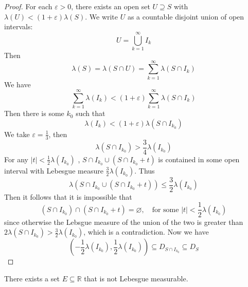 \documentclass[../main.tex]{subfiles}
\begin{document}
\begin{proof}
    For each \(   \varepsilon > 0  \), there exists an open set \(  U\supseteq S  \) with \(   \lambda \left( U \right)< \left( 1+  \varepsilon  \right) \lambda \left( S \right)     \). We write \(  U  \) as a countable disjoint union of open intervals: \[
    U = \bigcup _{k = 1}^{\infty}I_{k}
    \]Then \[
     \lambda \left( S \right)=  \lambda \left( S\cap U \right)= \sum _{k = 1}^{\infty} \lambda \left( S\cap I_{k} \right)   
    \] We have \[
    \sum _{k = 1}^{\infty} \lambda \left( I_{k} \right) < \left( 1+  \varepsilon  \right) \sum _{k= 1}^{\infty} \lambda \left( S\cap I_{k} \right)   
    \] Then there is some \(   k_0 \) such that \[
     \lambda \left( I_{k} \right)< \left( 1+  \varepsilon  \right) \lambda \left( S\cap I_{k_0} \right)   
    \]     We take \(   \varepsilon = \frac{1 }{3 }   \), then \[
     \lambda \left( S\cap I_{k_0} \right)> \frac{3 }{4 }  \lambda \left( I_{k_0} \right)   
    \] For any \(  \left| t \right|< \frac{1 }{2 }   \lambda \left( I_{k_0} \right)   \) , \(  S\cap I_{k_0}\cup \left( S\cap I_{k_0}+ t \right)   \) is contained in some open interval with Lebesgue measure \(  \frac{3}{2} \lambda \left( I_{k_0} \right)   \). Thus \[
     \lambda \left( S\cap I_{k_0}\cup \left( S\cap I_{k_0}+ t \right)  \right)\le \frac{3 }{2 } \lambda \left( I_{k_0} \right)   
    \]  Then it follows that it is impossible that \[
    \left( S\cap I_{k_0} \right)\cap \left( S\cap I_{k_0}+ t \right)= \varnothing ,\quad \text{for some }  \left| t \right|< \frac{1 }{2 }  \lambda \left( I_{k_0} \right)  
    \]since otherwise the Lebsgue measure of the union of the two is  greater than \(  2  \lambda \left( S\cap I_{k_0} \right)> \frac{3 }{2 } \lambda \left( I_{k_0} \right)     \), which is a contradiction. Now we have \[
    \left( -\frac{1}{2}\lambda \left( I_{k_0} \right)  ,\frac{1}{2}\lambda \left( I_{k_0} \right)   \right)\subseteq  D_{S\cap I_{k_0}}\subseteq D_{S} 
    \]
\end{proof}


\begin{exercise}{}{}
    There exists a set \(  E\subseteq \mathbb{R}   \)  that is not Lebesgue measurable. 
\end{exercise}
\end{document}
